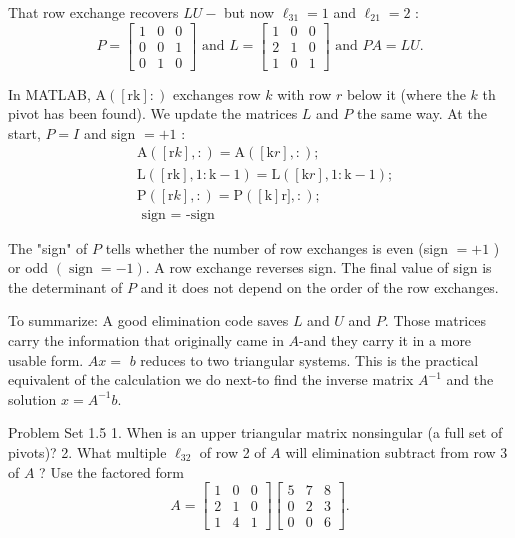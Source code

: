 That row exchange recovers $L U-$ but now $\ell_{31}=1$ and $\ell_{21}=2$ :
$$
P=\left[\begin{array}{lll}
1 & 0 & 0 \\
0 & 0 & 1 \\
0 & 1 & 0
\end{array}\right] \text { and } L=\left[\begin{array}{lll}
1 & 0 & 0 \\
2 & 1 & 0 \\
1 & 0 & 1
\end{array}\right] \text { and } P A=L U .
$$

In MATLAB, $\mathrm{A}([\mathrm{rk}]:)$ exchanges row $k$ with row $r$ below it (where the $k$ th pivot has been found). We update the matrices $L$ and $P$ the same way. At the start, $P=I$ and sign $=+1$ :
$$
\begin{aligned}
& \mathrm{A}([\mathrm{r} k],:)=\mathrm{A}([\mathrm{k} r],:) ; \\
& \mathrm{L}([\mathrm{rk}], 1: \mathrm{k}-1)=\mathrm{L}([\mathrm{k} r], 1: \mathrm{k}-1) ; \\
& \mathrm{P}([\mathrm{r} k],:)=\mathrm{P}([\mathrm{k}] \mathrm{r}],:) ; \\
& \text { sign = -sign }
\end{aligned}
$$

The "sign" of $P$ tells whether the number of row exchanges is even (sign $=+1$ ) or odd $(\operatorname{sign}=-1)$. A row exchange reverses sign. The final value of sign is the determinant of $P$ and it does not depend on the order of the row exchanges.

To summarize: A good elimination code saves $L$ and $U$ and $P$. Those matrices carry the information that originally came in $A$-and they carry it in a more usable form. $A x=$ $b$ reduces to two triangular systems. This is the practical equivalent of the calculation we do next-to find the inverse matrix $A^{-1}$ and the solution $x=A^{-1} b$.

Problem Set 1.5
1. When is an upper triangular matrix nonsingular (a full set of pivots)?
2. What multiple $\ell_{32}$ of row 2 of $A$ will elimination subtract from row 3 of $A$ ? Use the factored form
$$
A=\left[\begin{array}{lll}
1 & 0 & 0 \\
2 & 1 & 0 \\
1 & 4 & 1
\end{array}\right]\left[\begin{array}{lll}
5 & 7 & 8 \\
0 & 2 & 3 \\
0 & 0 & 6
\end{array}\right] .
$$

